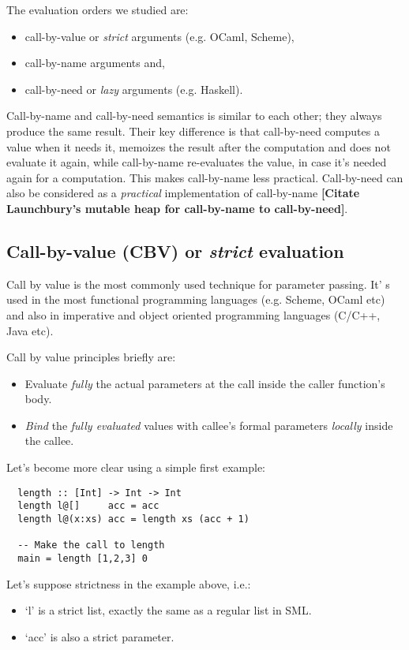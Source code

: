 \documentclass[diploma]{softlab-thesis}
\begin{document}
The evaluation orders we studied are: 
\begin{itemize}
  \item call-by-value or \textit{strict} arguments (e.g. OCaml, Scheme), 
  \item call-by-name arguments and,
  \item call-by-need or \textit{lazy} arguments (e.g. Haskell).
\end{itemize}

Call-by-name and call-by-need semantics is similar to each other; they always produce the same result.
Their key difference is that call-by-need computes a value when it needs it, memoizes the result after the computation 
and does not evaluate it again, while call-by-name re-evaluates the value, in case it's needed again for a computation.
This makes call-by-name less practical. Call-by-need can also be considered as a \textit{practical} implementation 
of call-by-name \textbf{[Citate Launchbury's mutable heap for call-by-name to call-by-need]}.

\subsection {Call-by-value (CBV) or \textit{strict} evaluation }

Call by value is the most commonly used technique for parameter passing. It' s used in the most functional 
programming languages (e.g. Scheme, OCaml etc) and also in imperative and object oriented programming 
languages (C/C++, Java etc).

\par Call by value principles briefly are:
\begin{itemize}
  \item Evaluate \textit{fully} the actual parameters at the call inside the caller function's body.
  \item \textit{Bind} the \textit{fully evaluated} values with callee's formal parameters \textit{locally} inside the callee.
\end{itemize}

Let's become more clear using a simple first example:
\begin{verbatim}
  length :: [Int] -> Int -> Int
  length l@[]     acc = acc 
  length l@(x:xs) acc = length xs (acc + 1)

  -- Make the call to length
  main = length [1,2,3] 0
\end{verbatim}

Let's suppose strictness in the example above, i.e.:
\begin{itemize}
  \item `l' is a strict list, exactly the same as a regular list in SML.
  \item  `acc' is also a strict parameter. 
\end{itemize}
\end{document}
